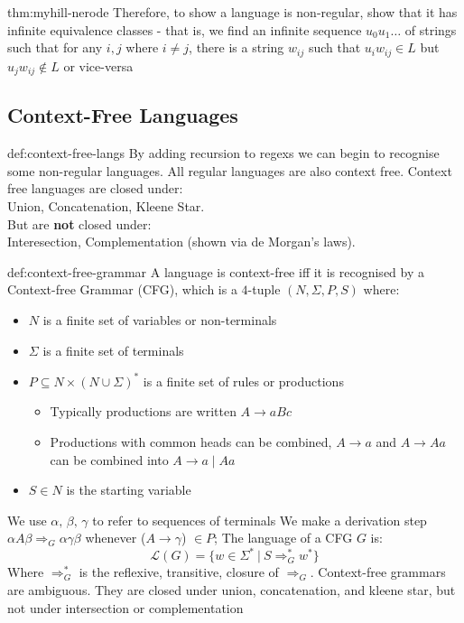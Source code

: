 \documentclass[landscape, 8pt]{extarticle}
\begin{document}
\begin{multicols}{3}
\begin{thm}{thm:myhill-nerode}{}
Therefore, to show a language is non-regular, show that it has infinite equivalence classes - that is, we find an infinite sequence $u_{0}u_{1}\dots$ of strings such that for any $i,j$ where $i\ne j$, there is a string $w_{ij}$ such that $u_{i}w_{ij}\in L$ but $u_{j}w_{ij}\not\in L$ or vice-versa
\end{thm}

\subsection*{Context-Free Languages}

\begin{dfn}{def:context-free-langs}{}
By adding recursion to regexs we can begin to recognise some non-regular languages. All regular languages are also context free. 
Context free languages are closed under:\\
Union, Concatenation, Kleene Star.\\
But are \textbf{not} closed under:\\
Interesection, Complementation (shown via de Morgan's laws).
\end{dfn}

\newpage

\begin{dfn}{def:context-free-grammar}{}
A language is context-free iff it is recognised by a Context-free Grammar (CFG), which is a $4$-tuple $(N,\Sigma, P, S)$ where:
\renewcommand\labelitemi{\tiny$\bullet$}
\begin{itemize}
    \setlength\itemsep{0em}
    \item $N$ is a finite set of variables or non-terminals
    \item $\Sigma$ is a finite set of terminals
    \item $P\subseteq N \times (N\cup \Sigma)^{*}$ is a finite set of rules or productions
    \renewcommand\labelitemi{\tiny$\bullet$}
    \begin{itemize}
        \setlength\itemsep{0em}
        \item Typically productions are written $A\to aBc$
        \item Productions with common heads can be combined, $A\to a$ and $A\to Aa$ can be combined into $A\to a \mid Aa$
    \end{itemize}
    \item $S\in N$ is the starting variable
\end{itemize}
We use $\alpha,\,\beta,\,\gamma$ to refer to sequences of terminals\newline
We make a derivation step $\alpha A \beta \Rightarrow_G \alpha \gamma \beta$ whenever ($A \to \gamma$) $\in P$; The language of a CFG $G$ is:
\[\mathcal{L}(G)=\{w \in \Sigma^* \:|\: S \Rightarrow_G^* w^*\}\]
\newline 
Where $\Rightarrow_G^*$ is the reflexive, transitive, closure of $\Rightarrow_G$.\newline
Context-free grammars are ambiguous. They are closed under union, concatenation, and kleene star, but not under intersection or complementation
\end{dfn}


\end{multicols}
\end{document}
